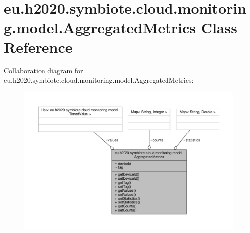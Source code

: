 \hypertarget{classeu_1_1h2020_1_1symbiote_1_1cloud_1_1monitoring_1_1model_1_1AggregatedMetrics}{}\section{eu.\+h2020.\+symbiote.\+cloud.\+monitoring.\+model.\+Aggregated\+Metrics Class Reference}
\label{classeu_1_1h2020_1_1symbiote_1_1cloud_1_1monitoring_1_1model_1_1AggregatedMetrics}


Collaboration diagram for eu.\+h2020.\+symbiote.\+cloud.\+monitoring.\+model.\+Aggregated\+Metrics\+:
\nopagebreak
\begin{figure}[H]
\begin{center}
\leavevmode
\includegraphics[width=350pt]{classeu_1_1h2020_1_1symbiote_1_1cloud_1_1monitoring_1_1model_1_1AggregatedMetrics__coll__graph}
\end{center}
\end{figure}
